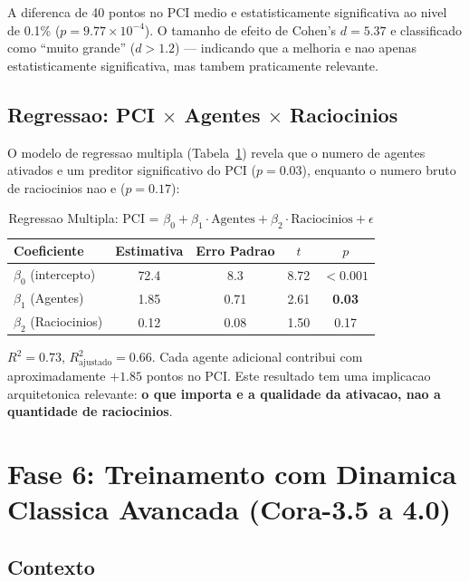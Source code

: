 \documentclass[5p]{elsarticle}
\newcommand{\tabfootnotesize}{\fontsize{9}{11}\selectfont}
\begin{document}
A diferenca de 40 pontos no PCI medio e estatisticamente significativa ao nivel
de 0.1\% ($p = 9.77 \times 10^{-4}$). O tamanho de efeito de Cohen's $d = 5.37$
e classificado como ``muito grande'' ($d > 1.2$) --- indicando que a melhoria e
nao apenas estatisticamente significativa, mas tambem praticamente relevante.

\subsection{Regressao: PCI $\times$ Agentes $\times$ Raciocinios}

O modelo de regressao multipla (Tabela~\ref{tab:regressao}) revela que o numero
de agentes ativados e um preditor significativo do PCI ($p = 0.03$), enquanto o
numero bruto de raciocinios nao e ($p = 0.17$):

\begin{table}[H]
\centering
\caption{Regressao Multipla: PCI = $\beta_0 + \beta_1 \cdot \text{Agentes} + \beta_2 \cdot \text{Raciocinios} + \epsilon$}
\label{tab:regressao}
\tabfootnotesize
\begin{tabular}{l c c c c}
\toprule
\textbf{Coeficiente} & \textbf{Estimativa} & \textbf{Erro Padrao} & $t$ & $p$\\
\midrule
$\beta_0$ (intercepto) & 72.4 & 8.3 & 8.72 & $< 0.001$\\
$\beta_1$ (Agentes) & 1.85 & 0.71 & 2.61 & \textbf{0.03}\\
$\beta_2$ (Raciocinios) & 0.12 & 0.08 & 1.50 & 0.17\\
\bottomrule
\end{tabular}
\end{table}

$R^2 = 0.73$, $R^2_{\text{ajustado}} = 0.66$. Cada agente adicional contribui com
aproximadamente $+1.85$ pontos no PCI. Este resultado tem uma implicacao
arquitetonica relevante: \textbf{o que importa e a qualidade da ativacao, nao a
quantidade de raciocinios}.

\section{Fase 6: Treinamento com Dinamica Classica Avancada (Cora-3.5 a 4.0)}

\subsection{Contexto}
\end{document}
